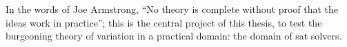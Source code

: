 In the words of Joe Armstrong\cite{armstrongThesis}, ``No theory is complete without proof that the
ideas work in practice''; this is the central project of this thesis, to test
the burgeoning theory of variation in a practical domain: the domain of \ac{sat}
solvers.

